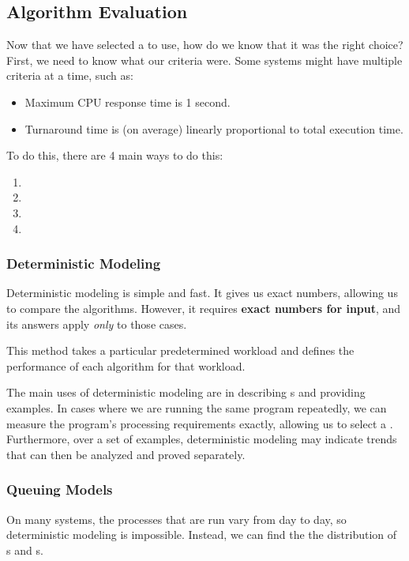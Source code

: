 \subsection{Algorithm Evaluation}\label{subsec:Algorithm_Evaluation}
Now that we have selected a  to use, how do we know that it was the right choice?
First, we need to know what our criteria were.
Some systems might have multiple criteria at a time, such as:
\begin{itemize}[noitemsep]
\item Maximum CPU response time is 1 second.
\item Turnaround time is (on average) linearly proportional to total execution time.
\end{itemize}

To do this, there are 4 main ways to do this:
\begin{enumerate}[noitemsep]
\item {}
\item {}
\item {}
\item {}
\end{enumerate}

\subsubsection{Deterministic Modeling}\label{subsubsec:Algorithm_Deterministic_Modeling}
Deterministic modeling is simple and fast.
It gives us exact numbers, allowing us to compare the algorithms.
However, it requires \textbf{exact numbers for input}, and its answers apply \emph{only} to those cases.

This method takes a particular predetermined workload and defines the performance of each algorithm for that workload.

The main uses of deterministic modeling are in describing s and providing examples.
In cases where we are running the same program repeatedly, we can measure the program’s processing requirements exactly, allowing us to select a .
Furthermore, over a set of examples, deterministic modeling may indicate trends that can then be analyzed and proved separately.

\subsubsection{Queuing Models}\label{subsubsec:Algorithm_Queuing_Models}
On many systems, the processes that are run vary from day to day, so deterministic modeling is impossible.
Instead, we can find the the distribution of s and s.

